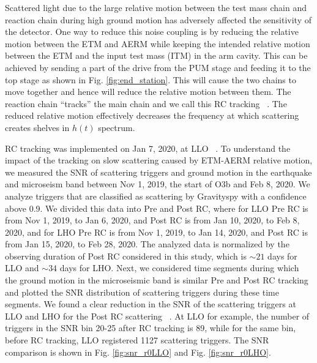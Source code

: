 \documentclass[12pt]{iopart}
\begin{document}
Scattered light due to the large relative motion between the test mass chain and reaction chain during high ground motion has adversely affected the sensitivity of the detector. 
One way to reduce this noise coupling is by reducing the relative motion between the ETM and AERM while keeping the intended relative motion between the ETM and the input test mass (ITM) in the arm cavity. This can be achieved by sending a part of the drive from the PUM stage and feeding it to the top stage as shown in Fig. \ref{fig:end_station}. This will cause the two chains to move together and hence will reduce the relative motion between them. The reaction chain ``tracks'' the main chain and we call this RC tracking ~\cite{alog_robert}.
The reduced relative motion effectively decreases the frequency at which scattering creates shelves in $h(t)$ spectrum. 

RC tracking was implemented on Jan 7, 2020, at LLO ~\cite{alog_anamaria}. To understand the impact of the tracking on slow scattering caused by ETM-AERM relative motion, we measured the SNR of scattering triggers and ground motion in the earthquake and microseism band between Nov 1, 2019, the start of O3b and Feb 8, 2020. We analyze triggers that are classified as scattering by Gravityspy with a confidence above 0.9. We divided this data into Pre and Post RC, where for LLO Pre RC is from Nov 1, 2019, to Jan 6, 2020, and Post RC is from Jan 10, 2020, to Feb 8, 2020, and for LHO Pre RC is from Nov 1, 2019, to Jan 14, 2020, and Post RC is from Jan 15, 2020, to Feb 28, 2020. The analyzed data is normalized by the observing duration of Post RC considered in this study, which is $\sim 21$ days for LLO and $\sim 34$ days for LHO. Next, we considered time segments during which the ground motion in the microseismic band is similar Pre and Post RC tracking and plotted the SNR distribution of scattering triggers during these time segments. We found a clear reduction in the SNR of the scattering triggers at LLO and LHO for the Post RC scattering ~\cite{alogsid_R0}. At LLO for example, the number of triggers in the SNR bin 20-25 after RC tracking is 89, while for the same bin, before RC tracking, LLO registered 1127 scattering triggers. The SNR comparison is shown in Fig. \ref{fig:snr_r0LLO}  and Fig. \ref{fig:snr_r0LHO}.
\end{document}
